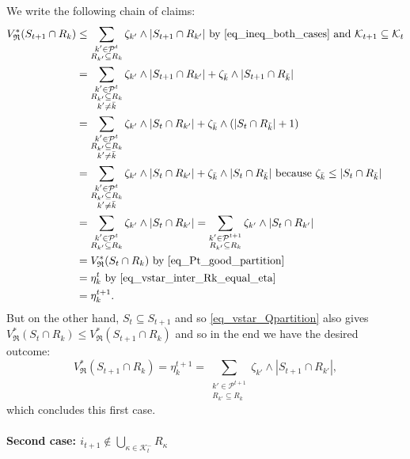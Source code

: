 \documentclass[
  11pt,
  a4paper,
]{article}
\let\oldparagraph\paragraph
\renewcommand{\paragraph}[1]{\oldparagraph{#1}\mbox{}}
\theoremstyle{definition}
\theoremstyle{plain}
\theoremstyle{plain}
\theoremstyle{plain}
\theoremstyle{definition}
\theoremstyle{remark}
\begin{document}
We write the following chain of claims: \begin{align*}
V^*_{\mathfrak{R}}(S_{t+1}\cap R_k)&\leq \sum_{\substack{k'\in\mathcal{P}^{t}\\R_{k'}\subseteq R_k}} \zeta_{k'}\wedge |S_{t+1}\cap R_{k'}|\text{ by~\eqref{eq_ineq_both_cases} and }\mathcal{K}_{t+1}\subseteq\mathcal{K}_t\\
&=\sum_{\substack{k'\in\mathcal{P}^{t}\\R_{k'}\subseteq R_k\\ k'\neq\bar k}} \zeta_{k'}\wedge |S_{t+1}\cap R_{k'}| + \zeta_{\bar k}\wedge |S_{t+1}\cap R_{\bar k}| \\
&=\sum_{\substack{k'\in\mathcal{P}^{t}\\R_{k'}\subseteq R_k\\ k'\neq\bar k}} \zeta_{k'}\wedge |S_{t}\cap R_{k'}| + \zeta_{\bar k}\wedge( |S_{t}\cap R_{\bar k}| +1)\\
&=\sum_{\substack{k'\in\mathcal{P}^{t}\\R_{k'}\subseteq R_k\\ k'\neq\bar k}} \zeta_{k'}\wedge |S_{t}\cap R_{k'}| + \zeta_{\bar k}\wedge|S_{t}\cap R_{\bar k}|\text{ because $\zeta_{\bar k}\leq |S_t\cap R_{\bar k}|$}\\
&=\sum_{\substack{k'\in\mathcal{P}^{t}\\R_{k'}\subseteq R_k}} \zeta_{k'}\wedge |S_{t}\cap R_{k'}|=\sum_{\substack{k'\in\mathcal{P}^{t+1}\\R_{k'}\subseteq R_k}} \zeta_{k'}\wedge |S_{t}\cap R_{k'}| \\
&=V^*_{\mathfrak{R}}(S_t\cap R_k)  \text{ by~\eqref{eq_Pt_good_partition}} \\
&= \eta_k^t  \text{ by~\eqref{eq_vstar_inter_Rk_equal_eta}} \\
&= \eta_k^{t+1}.\\
\end{align*} But on the other hand, \(S_t\subseteq S_{t+1}\) and so
\eqref{eq_vstar_Qpartition} also gives
\(V^*_{\mathfrak{R}}(S_t\cap R_k) \leq V^*_{\mathfrak{R}}(S_{t+1}\cap R_k)\)
and so in the end we have the desired outcome: \begin{equation*}
V^*_{\mathfrak{R}}(S_{t+1}\cap R_k) =  \eta_k^{t+1} =  \sum_{\substack{k'\in\mathcal{P}^{t+1}\\R_{k'}\subseteq R_k}} \zeta_{k'}\wedge |S_{t+1}\cap R_{k'}| ,
\end{equation*} which concludes this first case.

\paragraph{\texorpdfstring{Second case:
\(i_{t+1}\not\in\bigcup_{\kappa\in\mathcal{K}^-_{t}}R_{\kappa}\)}{Second case: i\_\{t+1\}\textbackslash not\textbackslash in\textbackslash bigcup\_\{\textbackslash kappa\textbackslash in\textbackslash mathcal\{K\}\^{}-\_\{t\}\}R\_\{\textbackslash kappa\}}}\label{second-case-i_t1notinbigcup_kappainmathcalk-_tr_kappa}
\end{document}
